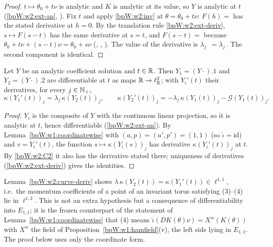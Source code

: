 \begin{proof}
\label{stepW:w2:oan}
$t\mapsto\theta_0+t\nu$ is analytic and $K$ is analytic at its value, so $Y$ is analytic at $t$
(\ref{bpW:w2:ext-an}, ).
\label{stepW:w2:oshift}
Fix $t$ and apply \eqref{bpW:w2:inv} at $\theta=\theta_0+t\nu$: $F(h)=$ 
has the stated derivative at $h=0$. By the translation rule \ref{bpW:w2:ext-deriv}, $s\mapsto F(s-t)$ has the same
derivative at $s=t$, and $F(s-t)=$  because $\theta_0+t\nu+(s-t)\nu=\theta_0+s\nu$
(, , ). The value of the derivative is
$\lambda_j\,$ $=\lambda_j\,$. The second component is identical.
\end{proof}

\begin{lemma}\label{bpW:w2:curve-deriv}
Let $Y$ be an analytic coefficient solution and $t\in\mathbb{R}$. Then $Y_1=(Y\cdot).1$ and $Y_2=(Y\cdot).2$ are
differentiable at $t$ as maps $\mathbb{R}\to\ell^2_{\mathbb{R}}$; with $Y_i'(t)$ their derivatives, for every $j\in\mathbb{N}_+$,
\[\kappa(Y_1'(t))_j=\lambda_j\,\kappa(Y_2(t))_j,\qquad\kappa(Y_2'(t))_j=-\lambda_j\,\kappa(Y_1(t))_j-\mathcal G(Y_1(t))_j.\]
\end{lemma}

\begin{proof}
\label{stepW:w2:cdiff}
$Y_i$ is the composite of $Y$ with the continuous linear projection, so it is analytic at $t$, hence differentiable
(\ref{bpW:w2:ext-an}).
\label{stepW:w2:ccoord}
By Lemma~\ref{bpW:w1:coordinatewise} with $(a,p)=(a',p')=(1,1)$ (so $\hat\iota=\mathrm{id}$) and $v=Y_i'(t)$, the
function $s\mapsto\kappa(Y_i(s))_j$ has derivative $\kappa(Y_i'(t))_j$ at $t$. By \ref{bpW:w2:C2} it also has the
derivative stated there; uniqueness of derivatives (\ref{bpW:w2:ext-deriv}) gives the identities.
\end{proof}

\begin{remark}\label{bpW:w2:hidden}
Lemma~\ref{bpW:w2:curve-deriv} shows $\lambda\,\kappa(Y_2(t))=\kappa(Y_1'(t))\in\ell^{1,1}$, i.e.\ the momentum
coefficients of a point of an invariant torus satisfying (3)--(4) lie in $\ell^{1,2}$. This is not an extra
hypothesis but a consequence of differentiability into $E_{1,1}$; it is the frozen counterpart of the statement of
Lemma~\ref{bpW:w1:coordinatewise} that (4) means $\hat\iota(DK(\theta)\nu)=X^w(K(\theta))$ with $X^w$ the field of
Proposition~\ref{bpW:w1:hamfield}(v), the left side lying in $E_{1,1}$. The proof below uses only the coordinate form.
\end{remark}

